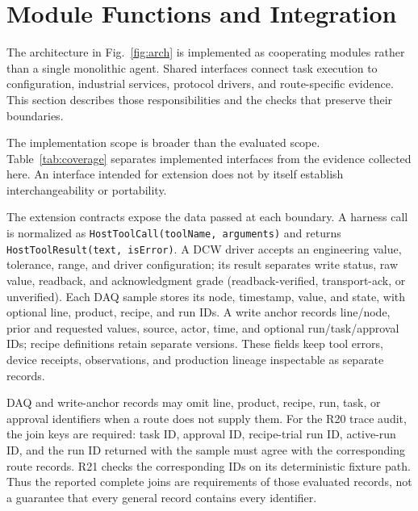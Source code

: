 \section{Module Functions and Integration}
\label{sec:modules}
The architecture in Fig.~\ref{fig:arch} is implemented as cooperating
modules rather than a single monolithic agent. Shared interfaces connect
task execution to configuration, industrial services, protocol drivers, and
route-specific evidence. This section describes those responsibilities and
the checks that preserve their boundaries.

The implementation scope is broader than the evaluated scope. Table~\ref{tab:coverage}
separates implemented interfaces from the evidence collected here. An
interface intended for extension does not by itself establish
interchangeability or portability.

The extension contracts expose the data passed at each boundary. A harness
call is normalized as \texttt{HostToolCall(toolName, arguments)} and returns
\texttt{HostToolResult(text, isError)}. A DCW driver accepts an engineering
value, tolerance, range, and driver configuration; its result separates write
status, raw value, readback, and acknowledgment grade (readback-verified,
transport-ack, or unverified). Each DAQ sample stores its node, timestamp,
value, and state, with optional line, product, recipe, and run IDs. A write
anchor records line/node, prior and requested values, source, actor, time, and
optional run/task/approval IDs; recipe definitions retain separate versions.
These fields keep tool errors, device receipts, observations, and production
lineage inspectable as separate records.

DAQ and write-anchor records may omit line, product, recipe, run, task, or
approval identifiers when a route does not supply them. For the R20 trace
audit, the join keys are required: task ID, approval ID, recipe-trial run ID,
active-run ID, and the run ID returned with the sample must agree with the
corresponding route records. R21 checks the corresponding IDs on its
deterministic fixture path. Thus the reported complete joins are requirements
of those evaluated records, not a guarantee that every general record
contains every identifier.

